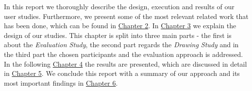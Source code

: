 In this report we thoroughly describe the design, execution and results of our user studies. Furthermore, we present some of the most relevant related work that has been done, which can be found in \hyperref[ch:related]{Chapter 2}. In \hyperref[ch:method]{Chapter 3} we explain the design of our studies. This chapter is split into three main parts - the first is about the \textit{Evaluation Study}, the second part regards the \textit{Drawing Study} and in the third part the chosen participants and the evaluation approach is addressed. In the following \hyperref[ch:results]{Chapter 4} the results are presented, which are discussed in detail in \hyperref[ch:discussion]{Chapter 5}. We conclude this report with a summary of our approach and its most important findings in \hyperref[ch:conclusion]{Chapter 6}. 